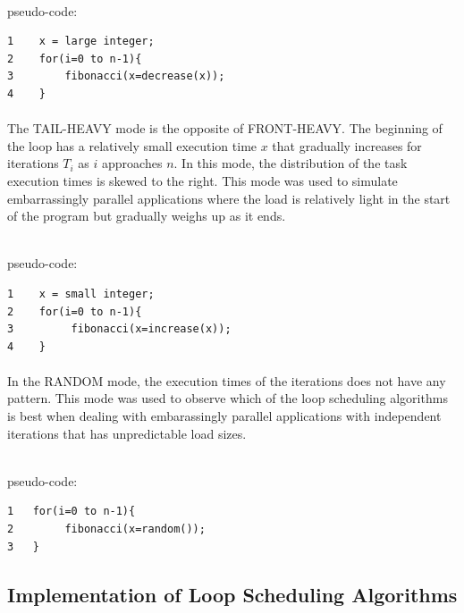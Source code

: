 \documentclass[10pt, twocolumn, letterpaper]{article}
\begin{document}
\textsf{\\pseudo-code:}
\begin{verbatim}
1    x = large integer;
2    for(i=0 to n-1){
3        fibonacci(x=decrease(x));
4    }
\end{verbatim}

\paragraph{}
The \textsf{TAIL-HEAVY} mode is the opposite of \textsf{FRONT-HEAVY}. The beginning of the loop has a relatively small execution time $x$ that gradually increases for iterations $T_i$ as $i$ approaches $n$. In this mode, the distribution of the task execution times is skewed to the right. This mode was used to simulate embarrassingly parallel applications where the load is relatively light in the start of the program but gradually weighs up as it ends.

\textsf{\\pseudo-code:}
\begin{verbatim}
1    x = small integer;
2    for(i=0 to n-1){
3         fibonacci(x=increase(x));
4    }
\end{verbatim}

\paragraph{}
In the \textsf{RANDOM} mode, the execution times of the iterations does not have any pattern. This mode was used to observe which of the loop scheduling algorithms is best when dealing with embarassingly parallel applications with independent iterations that has unpredictable load sizes.

\textsf{\\pseudo-code:}
\begin{verbatim}
1   for(i=0 to n-1){
2        fibonacci(x=random());
3   }
\end{verbatim}

\subsection{Implementation of Loop Scheduling Algorithms}
\end{document}
